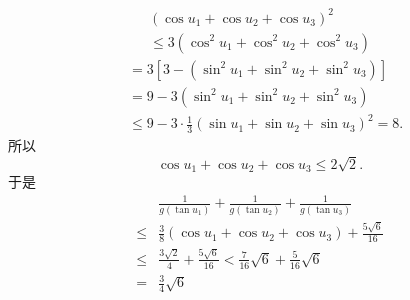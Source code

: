 $$
\begin{gathered}
\left(\cos u_1+\cos u_2+\cos u_3\right)^2 \\
\leqslant 3\left(\cos ^2 u_1+\cos ^2 u_2+\cos ^2 u_3\right)
\end{gathered}
$$
$$
\begin{aligned}
& =3\left[3-\left(\sin ^2 u_1+\sin ^2 u_2+\sin ^2 u_3\right)\right] \\
& =9-3\left(\sin ^2 u_1+\sin ^2 u_2+\sin ^2 u_3\right) \\
& \leqslant 9-3 \cdot \frac{1}{3}\left(\sin u_1+\sin u_2+\sin u_3\right)^2=8 .
\end{aligned}
$$
所以
$$
\cos u_1+\cos u_2+\cos u_3 \leqslant 2 \sqrt{2} .
$$
于是
$$
\begin{aligned}
& \frac{1}{g\left(\tan u_1\right)}+\frac{1}{g\left(\tan u_2\right)}+\frac{1}{g\left(\tan u_3\right)} \\
\leqslant & \frac{3}{8}\left(\cos u_1+\cos u_2+\cos u_3\right)+\frac{5 \sqrt{6}}{16} \\
\leqslant & \frac{3 \sqrt{2}}{4}+\frac{5 \sqrt{6}}{16}<\frac{7}{16} \sqrt{6}+\frac{5}{16} \sqrt{6} \\
= & \frac{3}{4} \sqrt{6}
\end{aligned}
$$


